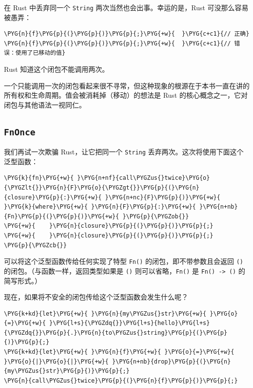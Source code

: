 在 Rust 中丢弃同一个 \texttt{String} 两次当然也会出事。幸运的是，Rust 可没那么容易被愚弄：

\begin{Verbatim}[commandchars=\\\{\},breaklines=true,breakanywhere=true,fontsize=\codefont,xleftmargin=17bp]
\PYG{n}{f}\PYG{p}{(}\PYG{p}{)}\PYG{p}{;}\PYG{+w}{  }\PYG{c+c1}{// 正确}
\PYG{n}{f}\PYG{p}{(}\PYG{p}{)}\PYG{p}{;}\PYG{+w}{  }\PYG{c+c1}{// 错误：使用了已移动的值}
\end{Verbatim}

Rust 知道这个闭包不能调用两次。

一个只能调用一次的闭包看起来很不寻常，但这种现象的根源在于本书一直在讲的所有权和生命周期。值会被消耗掉（移动）的想法是 Rust 的核心概念之一，它对闭包与其他语法一视同仁。

\subsection{\texttt{FnOnce}}

我们再试一次欺骗 Rust，让它把同一个 \texttt{String} 丢弃两次。这次将使用下面这个泛型函数：

\begin{Verbatim}[commandchars=\\\{\},breaklines=true,breakanywhere=true,fontsize=\codefont,xleftmargin=17bp]
\PYG{k}{fn}\PYG{+w}{ }\PYG{n+nf}{call\PYGZus{}twice}\PYG{o}{\PYGZlt{}}\PYG{n}{F}\PYG{o}{\PYGZgt{}}\PYG{p}{(}\PYG{n}{closure}\PYG{p}{:}\PYG{+w}{ }\PYG{n+nc}{F}\PYG{p}{)}\PYG{+w}{ }\PYG{k}{where}\PYG{+w}{ }\PYG{n}{F}\PYG{p}{:}\PYG{+w}{ }\PYG{n+nb}{Fn}\PYG{p}{(}\PYG{p}{)}\PYG{+w}{ }\PYG{p}{\PYGZob{}}
\PYG{+w}{    }\PYG{n}{closure}\PYG{p}{(}\PYG{p}{)}\PYG{p}{;}
\PYG{+w}{    }\PYG{n}{closure}\PYG{p}{(}\PYG{p}{)}\PYG{p}{;}
\PYG{p}{\PYGZcb{}}
\end{Verbatim}

可以将这个泛型函数传给任何实现了特型 \texttt{Fn()} 的闭包，即不带参数且会返回 \texttt{()} 的闭包。（与函数一样，返回类型如果是 \texttt{()} 则可以省略，\texttt{Fn()} 是 \texttt{Fn() -> ()} 的简写形式。）

现在，如果将不安全的闭包传给这个泛型函数会发生什么呢？

\begin{Verbatim}[commandchars=\\\{\},breaklines=true,breakanywhere=true,fontsize=\codefont,xleftmargin=17bp]
\PYG{k+kd}{let}\PYG{+w}{ }\PYG{n}{my\PYGZus{}str}\PYG{+w}{ }\PYG{o}{=}\PYG{+w}{ }\PYG{l+s}{\PYGZdq{}}\PYG{l+s}{hello}\PYG{l+s}{\PYGZdq{}}\PYG{p}{.}\PYG{n}{to\PYGZus{}string}\PYG{p}{(}\PYG{p}{)}\PYG{p}{;}
\PYG{k+kd}{let}\PYG{+w}{ }\PYG{n}{f}\PYG{+w}{ }\PYG{o}{=}\PYG{+w}{ }\PYG{o}{|}\PYG{o}{|}\PYG{+w}{ }\PYG{n+nb}{drop}\PYG{p}{(}\PYG{n}{my\PYGZus{}str}\PYG{p}{)}\PYG{p}{;}
\PYG{n}{call\PYGZus{}twice}\PYG{p}{(}\PYG{n}{f}\PYG{p}{)}\PYG{p}{;}
\end{Verbatim}

